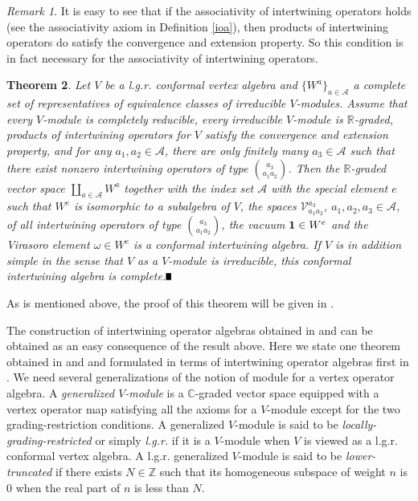\documentclass{amsproc}
\newtheorem{thm}{Theorem}[section]
\theoremstyle{definition}
\theoremstyle{remark}
\newtheorem{rema}[thm]{Remark}
\newcommand{\halmos}{\rule{1ex}{1.4ex}}
\newcommand{\epf}{\hspace*{\fill}\mbox{$\halmos$}}
\numberwithin{equation}{section}
\begin{document}
\begin{rema}
{\rm It is easy to see that 
 if the associativity of intertwining operators holds
 (see the associativity axiom in Definition \ref{ioa}), then products 
of intertwining operators do satisfy the convergence and extension property.
So this condition is in fact necessary for the  
associativity of intertwining operators. }
\end{rema}





\begin{thm}\label{cons-ioa}
Let $V$ be a l.g.r. conformal
vertex algebra and 
$\{W^{a}\}_{a\in \mathcal{A}}$
a complete set of representatives of  equivalence classes of
irreducible $V$-modules. Assume that every $V$-module is completely
reducible, every irreducible $V$-module
is $\mathbb{R}$-graded, products of
intertwining operators
for $V$ satisfy the
convergence and extension property, and for any 
$a_{1}, a_{2}\in \mathcal{A}$, there are only 
finitely many $a_{3}\in \mathcal{A}$ such that there exist
nonzero intertwining operators of type $\binom{a_{3}}{a_{1}a_{2}}$. 
Then the 
$\mathbb{R}$-graded vector space
$\coprod_{a\in \mathcal{A}}W^{a}$ 
together with the index set $\mathcal{A}$ with
the special element $e$ such that $W^{e}$ is isomorphic to 
a subalgebra of $V$,
the spaces $\mathcal{V}_{a_{1}a_{2}}^{a_{3}}$, $a_{1}, a_{2}, a_{3}\in
\mathcal{A}$, of all intertwining operators of type
$\binom{a_{3}}{a_{1}a_{2}}$, 
the vacuum ${\bf 1}\in W^{e}$ and the Virasoro element
$\omega\in W^{e}$ is a conformal intertwining algebra. 
If $V$ is in addition
simple in the sense that $V$ as a $V$-module is irreducible,
this conformal intertwining algebra is complete.\epf
\end{thm}

As is mentioned above, the proof of this theorem will be given in 
\cite{H7}.

The construction of intertwining operator algebras obtained in \cite{H1} 
and \cite{H3} can be obtained as an 
easy consequence of the result above. 
Here we state one theorem obtained in \cite{H1} 
and \cite{H3} and formulated in terms of intertwining operator algebras
 first in \cite{H4}. 
We need several generalizations of the notion of module
for a vertex operator algebra. A {\it generalized
$V$-module} is a $\mathbb{C}$-graded vector space equipped with a vertex
operator map satisfying all the axioms for a $V$-module except for the two
grading-restriction conditions. A generalized $V$-module 
is said to 
be {\it locally-grading-restricted} or simply {\it 
l.g.r.} if it
is a $V$-module when $V$ is viewed as a l.g.r. 
conformal vertex algebra. A l.g.r. generalized $V$-module is
said to be {\it lower-truncated} 
if there exists $N\in \mathbb{Z}$ such that
its homogeneous subspace of weight $n$ is
$0$ when the real part of $n$ is less than $N$.
\end{document}
